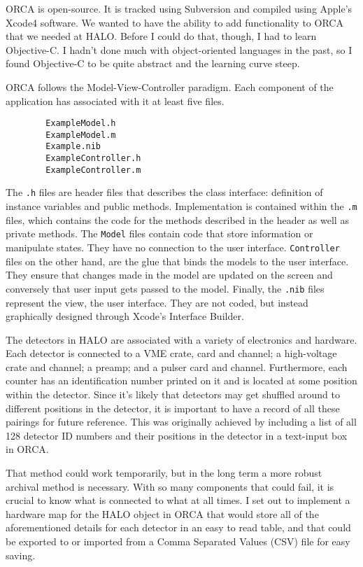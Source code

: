 		ORCA is open-source. It is tracked using Subversion and compiled using Apple's Xcode4 software. We wanted to have the ability to add functionality to ORCA that we needed at HALO. Before I could do that, though, I had to learn Objective-C. I hadn't done much with object-oriented languages in the past, so I found Objective-C to be quite abstract and the learning curve steep. 

		ORCA follows the Model-View-Controller paradigm. Each component of the application has associated with it at least five files. 

		\begin{verbatim}
		ExampleModel.h
		ExampleModel.m
		Example.nib
		ExampleController.h
		ExampleController.m
		\end{verbatim}

		The \verb$.h$ files are header files that describes the class interface: definition of instance variables and public methods. Implementation is contained within the \verb$.m$ files, which contains the code for the methods described in the header as well as private methods. The \verb$Model$ files contain code that store information or manipulate states. They have no connection to the user interface. \verb$Controller$ files on the other hand, are the glue that binds the models to the user interface. They ensure that changes made in the model are updated on the screen and conversely that user input gets passed to the model. Finally, the \verb$.nib$ files represent the view, the user interface. They are not coded, but instead graphically designed through Xcode's Interface Builder. 

		The \he detectors in HALO are associated with a variety of electronics and hardware. Each detector is connected to a VME crate, card and channel; a high-voltage crate and channel; a preamp; and a pulser card and channel. Furthermore, each counter has an identification number printed on it and is located at some position within the detector. Since it's likely that detectors may get shuffled around to different positions in the detector, it is important to have a record of all these pairings for future reference. This was originally achieved by including a list of all 128 detector ID numbers and their positions in the detector in a text-input box in ORCA. 

		That method could work temporarily, but in the long term a more robust archival method is necessary. With so many components that could fail, it is crucial to know what is connected to what at all times. I set out to implement a hardware map for the HALO object in ORCA that would store all of the aforementioned details for each detector in an easy to read table, and that could be exported to or imported from a Comma Separated Values (CSV) file for easy saving. 

